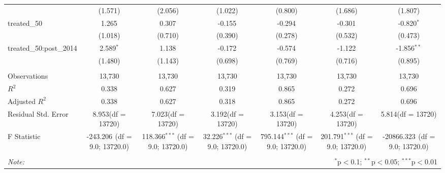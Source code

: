 \begin{table}[!htbp]
\begin{tabular}{@{\extracolsep{5pt}}lcccccc}
  & (1.571) & (2.056) & (1.022) & (0.800) & (1.686) & (1.807) \\
 treated_50 & 1.265$^{}$ & 0.307$^{}$ & -0.155$^{}$ & -0.294$^{}$ & -0.301$^{}$ & -0.820$^{*}$ \\
  & (1.018) & (0.710) & (0.390) & (0.278) & (0.532) & (0.473) \\
 treated_50:post_2014 & 2.589$^{*}$ & 1.138$^{}$ & -0.172$^{}$ & -0.574$^{}$ & -1.122$^{}$ & -1.856$^{**}$ \\
  & (1.480) & (1.143) & (0.698) & (0.769) & (0.716) & (0.895) \\
\hline \\[-1.8ex]
 Observations & 13,730 & 13,730 & 13,730 & 13,730 & 13,730 & 13,730 \\
 $R^2$ & 0.338 & 0.627 & 0.319 & 0.865 & 0.272 & 0.696 \\
 Adjusted $R^2$ & 0.338 & 0.627 & 0.318 & 0.865 & 0.272 & 0.696 \\
 Residual Std. Error & 8.953(df = 13720) & 7.023(df = 13720) & 3.192(df = 13720) & 3.153(df = 13720) & 4.253(df = 13720) & 5.814(df = 13720)  \\
 F Statistic & -243.206$^{}$ (df = 9.0; 13720.0) & 118.366$^{***}$ (df = 9.0; 13720.0) & 32.226$^{***}$ (df = 9.0; 13720.0) & 795.144$^{***}$ (df = 9.0; 13720.0) & 201.791$^{***}$ (df = 9.0; 13720.0) & -20866.323$^{}$ (df = 9.0; 13720.0) \\
\hline
\hline \\[-1.8ex]
\textit{Note:} & \multicolumn{6}{r}{$^{*}$p$<$0.1; $^{**}$p$<$0.05; $^{***}$p$<$0.01} \\
\end{tabular}
\end{table}